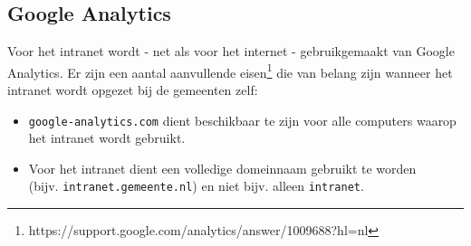 \subsection{Google Analytics}\label{analyticsintranet}

Voor het intranet wordt - net als voor het internet - gebruikgemaakt van Google Analytics. Er zijn een aantal aanvullende eisen\footnote{https://support.google.com/analytics/answer/1009688?hl=nl} die van belang zijn wanneer het intranet wordt opgezet bij de gemeenten zelf:
\begin{itemize}
\item \texttt{google-analytics.com} dient beschikbaar te zijn voor alle computers waarop het intranet wordt gebruikt.
\item Voor het intranet dient een volledige domeinnaam gebruikt te worden \\ (bijv. \texttt{intranet.gemeente.nl}) en niet bijv. alleen \texttt{intranet}.
\end{itemize}